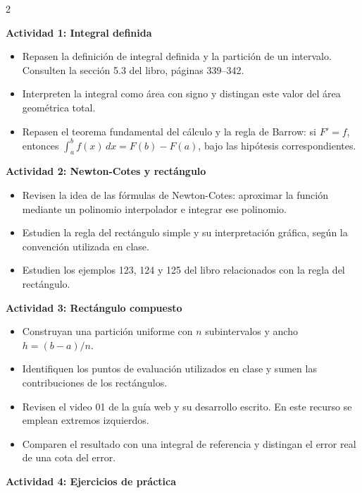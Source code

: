 \documentclass[10pt,letterpaper]{article}
\begin{document}
\begin{multicols}{2}
{\color{actividades}\textbf{Actividad 1: Integral definida}\par}
\begin{itemize}
\item Repasen la definición de integral definida y la partición de un intervalo. Consulten la sección 5.3 del libro, páginas 339--342.
\item Interpreten la integral como área con signo y distingan este valor del área geométrica total.
\item Repasen el teorema fundamental del cálculo y la regla de Barrow: si $F'=f$, entonces $\int_a^b f(x)\,dx=F(b)-F(a)$, bajo las hipótesis correspondientes.
\end{itemize}

{\color{actividades}\textbf{Actividad 2: Newton-Cotes y rectángulo}}
\begin{itemize}
\item Revisen la idea de las fórmulas de Newton-Cotes: aproximar la función mediante un polinomio interpolador e integrar ese polinomio.
\item Estudien la regla del rectángulo simple y su interpretación gráfica, según la convención utilizada en clase.
\item Estudien los ejemplos 123, 124 y 125 del libro relacionados con la regla del rectángulo.
\end{itemize}

\columnbreak
{\color{actividades}\textbf{Actividad 3: Rectángulo compuesto}\par}
\begin{itemize}
\item Construyan una partición uniforme con $n$ subintervalos y ancho $h=(b-a)/n$.
\item Identifiquen los puntos de evaluación utilizados en clase y sumen las contribuciones de los rectángulos.
\item Revisen el video 01 de la guía web y su desarrollo escrito. En este recurso se emplean extremos izquierdos.
\item Comparen el resultado con una integral de referencia y distingan el error real de una cota del error.
\end{itemize}

{\color{actividades}\textbf{Actividad 4: Ejercicios de práctica}}


\end{multicols}
\end{document}
